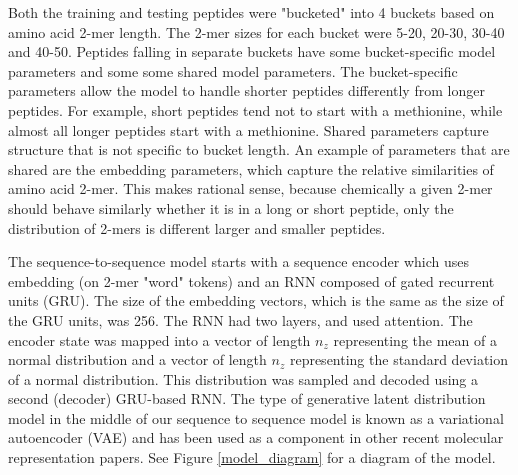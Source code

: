 \documentclass[preprint,12pt]{elsarticle}
\begin{document}
Both the training and testing peptides were "bucketed" into 4 buckets based on amino acid 2-mer length. The 2-mer sizes for each bucket were 5-20, 20-30, 30-40 and 40-50. Peptides falling in separate buckets have some bucket-specific model parameters and some some shared model parameters. The bucket-specific parameters allow the model to handle shorter peptides differently from longer peptides. For example, short peptides tend not to start with a methionine, while almost all longer peptides start with a methionine. Shared parameters capture structure that is not specific to bucket length. An example of parameters that are shared are the embedding parameters, which capture the relative similarities of amino acid 2-mer. This makes rational sense, because chemically a given 2-mer should behave similarly whether it is in a long or short peptide, only the distribution of 2-mers is different larger and smaller peptides.

%
%

The sequence-to-sequence model starts with a sequence encoder which uses embedding (on 2-mer "word" tokens) and an RNN composed of gated recurrent units (GRU)\cite{chung2014empirical}. The size of the embedding vectors, which is the same as the size of the GRU units, was 256. The RNN had two layers, and used attention\cite{chorowski2014end}. The encoder state was mapped into a vector of length $n_z$ representing the mean of a normal distribution and a vector of length $n_z$ representing the standard deviation of a normal distribution. This distribution was sampled and decoded using a second (decoder) GRU-based RNN. The type of generative latent distribution model in the middle of our sequence to sequence model is known as a variational autoencoder (VAE) and has been used as a component in other recent molecular representation papers\cite{gomez2016automatic}. See Figure \ref{model_diagram} for a diagram of the model.
\end{document}
